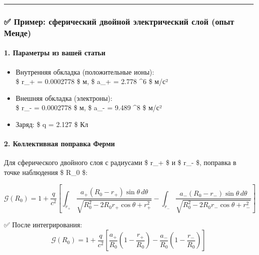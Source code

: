 \documentclass[11pt]{article}
\providecommand{\tightlist}{%
      \setlength{\itemsep}{0pt}\setlength{\parskip}{0pt}}
\begin{document}
\begin{center}\rule{0.5\linewidth}{\linethickness}\end{center}

\subsubsection{✅ Пример: сферический двойной электрический слой (опыт
Менде)}\label{ux43fux440ux438ux43cux435ux440-ux441ux444ux435ux440ux438ux447ux435ux441ux43aux438ux439-ux434ux432ux43eux439ux43dux43eux439-ux44dux43bux435ux43aux442ux440ux438ux447ux435ux441ux43aux438ux439-ux441ux43bux43eux439-ux43eux43fux44bux442-ux43cux435ux43dux434ux435}

\paragraph{1. Параметры из вашей
статьи}\label{ux43fux430ux440ux430ux43cux435ux442ux440ux44b-ux438ux437-ux432ux430ux448ux435ux439-ux441ux442ux430ux442ux44cux438}

\begin{itemize}
\tightlist
\item
  Внутренняя обкладка (положительные ионы):\\
  \$ r\_+ = 0.0002778 \$ м, \$ a\_+ = 2.778 \^{}6 \$ м/с²
\item
  Внешняя обкладка (электроны):\\
  \$ r\_- = 0.0002778 \$ м, \$ a\_- = 9.489 \^{}8 \$ м/с²
\item
  Заряд: \$ q = 2.127 \$ Кл
\end{itemize}

\paragraph{2. Коллективная поправка
Ферми}\label{ux43aux43eux43bux43bux435ux43aux442ux438ux432ux43dux430ux44f-ux43fux43eux43fux440ux430ux432ux43aux430-ux444ux435ux440ux43cux438}

Для сферического двойного слоя с радиусами \$ r\_+ \$ и \$ r\_- \$,
поправка в точке наблюдения \$ R\_0 \$:

\[
\mathcal{G}(R_0) = 1 + \frac{q}{c^2} \left[ \int_{r_+} \frac{a_+ (R_0 - r_+) \sin\theta \, d\theta}{\sqrt{R_0^2 - 2R_0 r_+ \cos\theta + r_+^2}} - \int_{r_-} \frac{a_- (R_0 - r_-) \sin\theta \, d\theta}{\sqrt{R_0^2 - 2R_0 r_- \cos\theta + r_-^2}} \right]
\]

✅ После интегрирования: \[
\mathcal{G}(R_0) = 1 + \frac{q}{c^2} \left[ \frac{a_+}{R_0} \left(1 - \frac{r_+}{R_0}\right) - \frac{a_-}{R_0} \left(1 - \frac{r_-}{R_0}\right) \right]
\]
\end{document}
